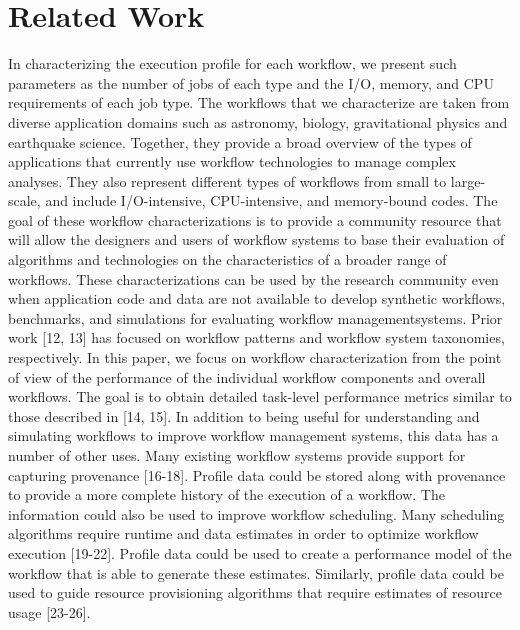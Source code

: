 \documentclass[final,5p,times,twocolumn]{elsarticle}
\begin{document}
\section{Related Work}

In characterizing the execution profile for each workflow, we present such parameters as the number of 
jobs of each type and the I/O, memory, and CPU requirements of each job type. The workflows that we 
characterize are taken from diverse application domains such as astronomy, biology, gravitational physics and 
earthquake science. Together, they provide a broad overview of the types of applications that currently use 
workflow technologies to manage complex analyses. They also represent different types of workflows from small 
to large-scale, and include I/O-intensive, CPU-intensive, and memory-bound codes.
The goal of these workflow characterizations is to provide a community resource that will allow the designers 
and users of workflow systems to base their evaluation of algorithms and technologies on the characteristics of a 
broader range of workflows. These characterizations can be used by the research community even when application 
code and data are not available to develop synthetic workflows, benchmarks, and simulations for evaluating 
workflow managementsystems. 
Prior work [12, 13] has focused on workflow patterns and workflow system taxonomies, respectively. In this 
paper, we focus on workflow characterization from the point of view of the performance of the individual 
workflow components and overall workflows. The goal is to obtain detailed task-level performance metrics similar 
to those described in [14, 15]. In addition to being useful for understanding and simulating workflows to improve 
workflow management systems, this data has a number of other uses. Many existing workflow systems provide 
support for capturing provenance [16-18]. Profile data could be stored along with provenance to provide a more 
complete history of the execution of a workflow. The information could also be used to improve workflow 
scheduling. Many scheduling algorithms require runtime and data estimates in order to optimize workflow 
execution [19-22]. Profile data could be used to create a performance model of the workflow that is able to 
generate these estimates. Similarly, profile data could be used to guide resource provisioning algorithms that 
require estimates of resource usage [23-26].
\end{document}
